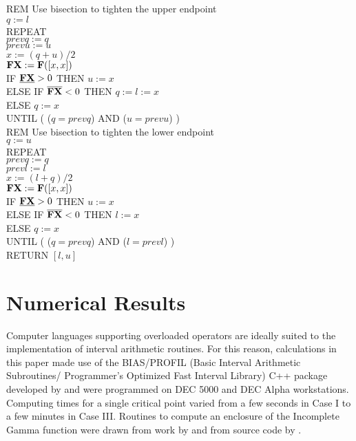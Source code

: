 \begin{tabbing}
REM Use bisection to tighten the upper endpoint \\
$ q := l $ \\ 
REPEAT \\
\> $ prevq := q $ \\
\> $ prevu := u $ \\
\> $ x := (q + u) / 2 $ \\
\> $ {\bf FX} := {\bf F}([x,x]) $ \\
\> IF $\underline{{\bf FX}} > 0$ THEN $ u := x $ \\
\> ELSE IF $\overline{{\bf FX}} < 0 $ THEN $ q := l := x $ \\
\> ELSE $ q := x$ \\
UNTIL ( ($q = prevq$) AND ($u = prevu$) ) \\

REM Use bisection to tighten the lower endpoint \\
$ q := u $ \\ 
REPEAT \\
\> $ prevq := q $ \\
\> $ prevl := l $ \\
\> $ x := (l + q) / 2 $ \\
\> $ {\bf FX} := {\bf F}([x,x]) $ \\
\> IF $\underline{{\bf FX}} > 0$ THEN $ u := x $ \\
\> ELSE IF $\overline{{\bf FX}} < 0 $ THEN $ l := x $ \\
\> ELSE $ q := x$ \\
UNTIL ( ($q = prevq$) AND ($l = prevl$) ) \\

RETURN $[l,u]$

\end{tabbing}

\section{Numerical Results}

Computer languages supporting overloaded operators are
ideally suited to the implementation of interval arithmetic routines.
For this reason, 
calculations in this paper made use of the BIAS/PROFIL 
(Basic Interval Arithmetic Subroutines/
Programmer's Optimized Fast Interval Library) C++ package developed by
\cite{KnuppelBIAS, KnuppelPROFIL} and were programmed on DEC 5000
and DEC Alpha workstations.  
Computing times for a single critical point varied from a few
seconds in Case I to a few minutes in Case III.
Routines to compute an enclosure of the Incomplete Gamma function were drawn
from work by \cite{WangKennedyJASA} and from source code by \cite{Gessner}.

